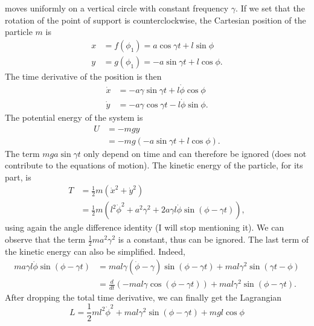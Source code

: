 \begin{subproblem}
{
moves uniformly on a vertical circle with constant frequency $\gamma$.
}
{
If we set that the rotation of the point of support is counterclockwise, the Cartesian position of the particle $m$ is
\begin{align*}
    x &= f(\phi_1) = a \cos{\gamma t} + l \sin{\phi} \\
    y &= g(\phi_1) = -a \sin{\gamma t} + l \cos{\phi} .
\end{align*}
The time derivative of the position is then
\begin{align*}
    \Dot{x} &= -a \gamma \sin{\gamma t} + l \Dot{\phi} \cos{\phi} \\
    \Dot{y} &= -a \gamma \cos{\gamma t} - l \Dot{\phi} \sin{\phi} .
\end{align*}
The potential energy of the system is 
\begin{align*}
    U &= -mgy \\
    &= -mg(-a \sin{\gamma t} + l \cos{\phi}).
\end{align*}
The term $mga \sin{\gamma t}$ only depend on time and can therefore be ignored (does not contribute to the equations of motion). The kinetic energy of the particle, for its part, is
\begin{align*}
    T &= \frac{1}{2} m (\Dot{x}^2 + \Dot{y}^2)\\
    &= \frac{1}{2} m \left(l^2\Dot{\phi}^2 + a^2\gamma^2 +2a\gamma l \Dot{\phi}\sin{(\phi - \gamma t)}\right),
\end{align*}
using again the angle difference identity (I will stop mentioning it). We can observe that the term $\frac{1}{2}ma^2\gamma^2$ is a constant, thus can be ignored. The last term of the kinetic energy can also be simplified. Indeed, 
\begin{align*}
      m a\gamma l \Dot{\phi}\sin{(\phi - \gamma t)} &= m a l \gamma (\dot{\phi} - \gamma) \sin(\phi - \gamma t) + m a l \gamma^2 \sin(\gamma t - \phi) \\
     &= \frac{d}{dt} \left(-m a l  \gamma \cos(\phi - \gamma t) \right) + m a l  \gamma^2 \sin(\phi - \gamma t) .
\end{align*}
After dropping the total time derivative, we can finally get the Lagrangian
}
{
\begin{equation*}
    L = \frac{1}{2} m l^2\Dot{\phi}^2 + m a l  \gamma^2 \sin(\phi - \gamma t)  + mgl\cos{\phi}
\end{equation*}
}
\end{subproblem}

